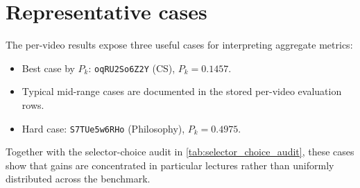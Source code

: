 \begin{table}[htbp]
  \centering
  \caption{Selected additional benchmark and diagnostic rows.}
  \label{tab:additional_benchmarks}
  \small
  \scriptsize
\end{table}

\section{Representative cases}
\label{app:qualitative}

The per-video results expose three useful cases for interpreting aggregate
metrics:

\begin{itemize}
  \item Best case by $P_k$: \texttt{oqRU2So6Z2Y} (CS), $P_k=0.1457$.
  \item Typical mid-range cases are documented in the stored per-video
    evaluation rows.
  \item Hard case: \texttt{S7TUe5w6RHo} (Philosophy), $P_k=0.4975$.
\end{itemize}

Together with the selector-choice audit in
\cref{tab:selector_choice_audit}, these cases show that gains are concentrated
in particular lectures rather than uniformly distributed across the benchmark.
